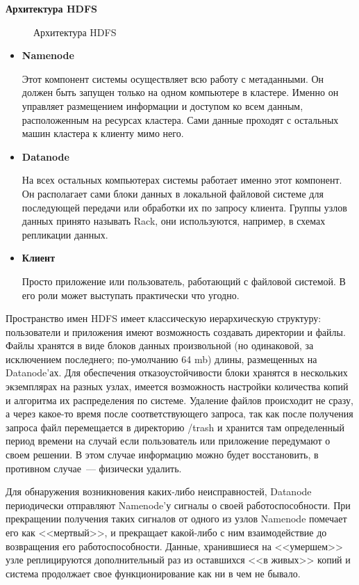 \textbf{Архитектура HDFS}

\begin{figure}[ht!]
\caption{Архитектура HDFS}
\label{fig:hdfsarchitecture}
\end{figure}

\begin{itemize}
\item \textbf{Namenode}

Этот компонент системы осуществляет всю работу с метаданными. Он должен быть запущен только на одном компьютере 
в кластере. Именно он управляет размещением информации и доступом ко всем данным, расположенным на ресурсах кластера. 
Сами данные проходят с остальных машин кластера к клиенту мимо него.

\item \textbf{Datanode}

На всех остальных компьютерах системы работает именно этот компонент. Он располагает сами блоки данных в локальной 
файловой системе для последующей передачи или обработки их по запросу клиента. Группы узлов данных принято называть 
Rack, они используются, например, в схемах репликации данных.

\item \textbf{Клиент}

Просто приложение или пользователь, работающий с файловой системой. В его роли может выступать практически что угодно.
\end{itemize}

Пространство имен HDFS имеет классическую иерархическую структуру: пользователи и приложения имеют возможность 
создавать директории и файлы. Файлы хранятся в виде блоков данных произвольной (но одинаковой, за исключением последнего; 
по-умолчанию 64 mb) длины, размещенных на Datanode'ах. Для обеспечения отказоустойчивости блоки хранятся в нескольких 
экземплярах на разных узлах, имеется возможность настройки количества копий и алгоритма их распределения по системе. 
Удаление файлов происходит не сразу, а через какое-то время после соответствующего запроса, так как после получения 
запроса файл перемещается в директорию /trash и хранится там определенный период времени на случай если пользователь 
или приложение передумают о своем решении. В этом случае информацию можно будет восстановить, в противном случае~--- физически удалить.

Для обнаружения возникновения каких-либо неисправностей, Datanode периодически отправляют Namenode'у сигналы о 
своей работоспособности. При прекращении получения таких сигналов от одного из узлов Namenode помечает его как <<мертвый>>, 
и прекращает какой-либо с ним взаимодействие до возвращения его работоспособности. Данные, хранившиеся на <<умершем>> узле 
реплицируются дополнительный раз из оставшихся <<в живых>> копий и система продолжает свое функционирование как ни в чем не бывало.

